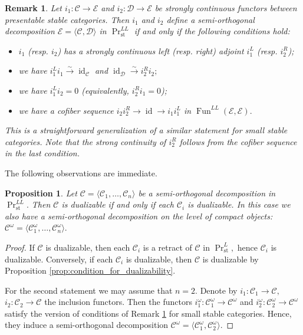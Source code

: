 \documentclass[11pt,leqno]{amsart}
\newtheorem{prop}[theo]{Proposition}
\newtheorem{remark}[theo]{Remark}
\numberwithin{equation}{section}
\newcommand{\xto}{\xrightarrow}
\newcommand{\st}{\operatorname{st}}
\newcommand{\cD}{{\mathcal D}}
\newcommand{\cC}{{\mathcal C}}
\newcommand{\cE}{{\mathcal E}}
\newcommand{\la}{\langle}
\newcommand{\ra}{\rangle}
\newcommand{\Fun}{\operatorname{Fun}}
\newcommand{\id}{\operatorname{id}}
\begin{document}
\begin{remark}\label{rem:SOD_PR^LL} Let $i_1:\cC\to\cE$ and $i_2:\cD\to\cE$ be strongly continuous functors between presentable stable categories. Then $i_1$ and $i_2$ define a semi-orthogonal decomposition $\cE=\la \cC,\cD\ra$ in $\Pr_{\st}^{LL}$ if and only if the following conditions hold:

\begin{itemize}
\item $i_1$ (resp. $i_2$) has a strongly continuous left (resp. right) adjoint $i_1^L$ (resp. $i_2^R$);

\item we have $i_1^L i_1\xto{\sim}\id_{\cC}$ and $\id_{\cD}\xto{\sim}i_2^R i_2;$

\item we have $i_1^L i_2=0$ (equivalently, $i_2^R i_1=0$);

\item we have a cofiber sequence $i_2 i_2^R\to\id\to i_1 i_1^L$ in $\Fun^{LL}(\cE,\cE).$
\end{itemize}

This is a straightforward generalization of a similar statement for small stable categories. Note that the strong continuity of $i_2^R$ follows from the cofiber sequence in the last condition.
\end{remark}

The following observations are immediate.

\begin{prop}\label{prop:finite_SOD_dualizable} Let $\cC=\la \cC_1,\dots,\cC_n\ra$ be a semi-orthogonal decomposition in $\Pr_{\st}^{LL}.$ Then $\cC$ is dualizable if and only if each $\cC_i$ is dualizable. In this case we also have a semi-orthogonal decomposition on the level of compact objects: $\cC^{\omega}=\la \cC_1^{\omega},\dots,\cC_n^{\omega}\ra.$\end{prop}

\begin{proof}If $\cC$ is dualizable, then each $\cC_i$ is a retract of $\cC$ in $\Pr^L_{\st},$ hence $\cC_i$ is dualizable. Conversely, if each $\cC_i$ is dualizable, then $\cC$ is dualizable by Proposition \ref{prop:condition_for_dualizability}.

For the second statement we may assume that $n=2.$ Denote by $i_1:\cC_1\to\cC,$ $i_2:\cC_2\to\cC$ the inclusion functors. Then the functors $i_1^{\omega}:\cC_1^{\omega}\to\cC^{\omega}$ and $i_2^{\omega}:\cC_2^{\omega}\to\cC^{\omega}$ satisfy the version of conditions of Remark \ref{rem:SOD_PR^LL} for small stable categories. Hence, they induce a semi-orthogonal decomposition $\cC^{\omega}=\la \cC_1^{\omega},\cC_2^{\omega}\ra.$\end{proof}
\end{document}
